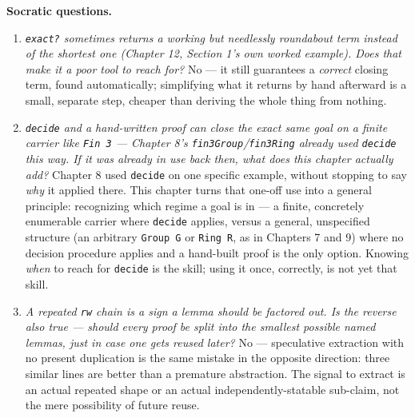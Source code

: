 \textbf{Socratic questions.}

\begin{enumerate}
\def\labelenumi{\arabic{enumi}.}
\tightlist
\item
  \emph{\texttt{exact?} sometimes returns a working but needlessly roundabout term instead of the shortest one (Chapter 12, Section 1's own worked example). Does that make it a poor tool to reach for?} No --- it still guarantees a \emph{correct} closing term, found automatically; simplifying what it returns by hand afterward is a small, separate step, cheaper than deriving the whole thing from nothing.
\item
  \emph{\texttt{decide} and a hand-written proof can close the exact same goal on a finite carrier like \texttt{Fin 3} --- Chapter 8's \texttt{fin3Group}/\texttt{fin3Ring} already used \texttt{decide} this way. If it was already in use back then, what does this chapter actually add?} Chapter 8 used \texttt{decide} on one specific example, without stopping to say \emph{why} it applied there. This chapter turns that one-off use into a general principle: recognizing which regime a goal is in --- a finite, concretely enumerable carrier where \texttt{decide} applies, versus a general, unspecified structure (an arbitrary \texttt{Group G} or \texttt{Ring R}, as in Chapters 7 and 9) where no decision procedure applies and a hand-built proof is the only option. Knowing \emph{when} to reach for \texttt{decide} is the skill; using it once, correctly, is not yet that skill.
\item
  \emph{A repeated \texttt{rw} chain is a sign a lemma should be factored out. Is the reverse also true --- should every proof be split into the smallest possible named lemmas, just in case one gets reused later?} No --- speculative extraction with no present duplication is the same mistake in the opposite direction: three similar lines are better than a premature abstraction. The signal to extract is an actual repeated shape or an actual independently-statable sub-claim, not the mere possibility of future reuse.
\end{enumerate}

